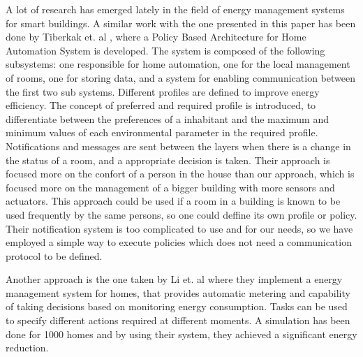 \label{chap:relatedwork}
A lot of research has emerged lately in the field of energy management systems for smart buildings. 
A similar work with the one presented in this paper has been done by Tiberkak et. al \cite{Tiberkak10}, where a Policy Based Architecture for Home Automation
System is developed. The system is composed of the following subsystems: one responsible
for home automation, one for the local management of rooms, one for storing data, and a system for enabling communication between the first two sub systems. Different profiles are defined to improve energy efficiency.
The concept of preferred and required profile is introduced, to differentiate between the preferences of a inhabitant and the maximum and minimum values of each environmental parameter in the required profile. Notifications
and messages are sent between the layers when there is a change in the status of a room, and a appropriate decision is taken. Their approach is focused more on the confort of a person in the house than our approach, which is focused more on the management of a bigger building with more sensors and actuators. This approach could be used if a room in a building is known to be used frequently by the same persons, so one could deffine its own profile or policy. Their notification system is too complicated to use and for our needs, so we have employed a simple way to execute policies which does not need a communication protocol to be defined. 

Another approach is the one taken by Li et. al \cite{Li11} where they implement a energy management system for homes, that provides automatic metering and capability of taking decisions based on monitoring energy consumption. 
Tasks can be used to specify different actions required at different moments. A simulation has been done for 1000 homes and by using their system, they achieved a significant energy reduction.

